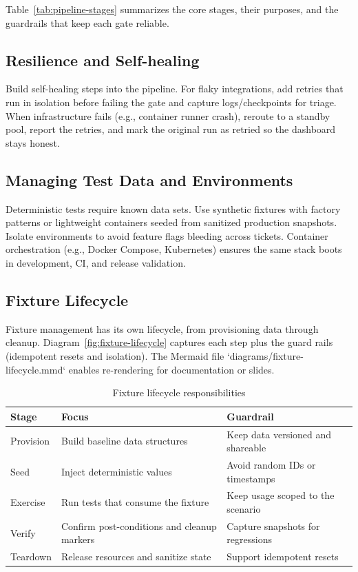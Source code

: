 Table~\ref{tab:pipeline-stages} summarizes the core stages, their purposes, and the guardrails that keep each gate reliable.

\subsection{Resilience and Self-healing}

Build self-healing steps into the pipeline. For flaky integrations, add retries that run in isolation before failing the gate and capture logs/checkpoints for triage. When infrastructure fails (e.g., container runner crash), reroute to a standby pool, report the retries, and mark the original run as retried so the dashboard stays honest.

\subsection{Managing Test Data and Environments}

Deterministic tests require known data sets. Use synthetic fixtures with factory patterns or lightweight containers seeded from sanitized production snapshots. Isolate environments to avoid feature flags bleeding across tickets. Container orchestration (e.g., Docker Compose, Kubernetes) ensures the same stack boots in development, CI, and release validation.

\subsection{Fixture Lifecycle}

Fixture management has its own lifecycle, from provisioning data through cleanup. Diagram~\ref{fig:fixture-lifecycle} captures each step plus the guard rails (idempotent resets and isolation). The Mermaid file `diagrams/fixture-lifecycle.mmd` enables re-rendering for documentation or slides.



\begin{table}[h]
\centering
\caption{Fixture lifecycle responsibilities}
\label{tab:fixture-lifecycle}
\begin{tabular}{p{3cm}p{5cm}p{3cm}}
\toprule
Stage & Focus & Guardrail \\
\midrule
Provision & Build baseline data structures & Keep data versioned and shareable \\
Seed & Inject deterministic values & Avoid random IDs or timestamps \\
Exercise & Run tests that consume the fixture & Keep usage scoped to the scenario \\
Verify & Confirm post-conditions and cleanup markers & Capture snapshots for regressions \\
Teardown & Release resources and sanitize state & Support idempotent resets \\
\bottomrule
\end{tabular}
\end{table}

